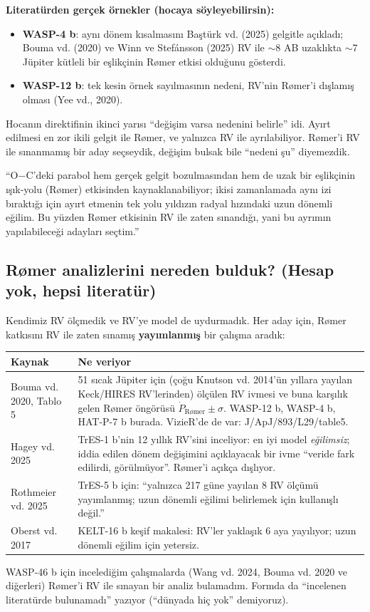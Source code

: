 \documentclass[11pt,a4paper]{article}
\newcommand{\OC}{O$-$C}
\begin{document}
\textbf{Literatürden gerçek örnekler (hocaya söyleyebilirsin):}
\begin{itemize}
\item \textbf{WASP-4 b}: aynı dönem kısalmasını Baştürk vd. (2025) gelgitle açıkladı; Bouma vd. (2020) ve Winn ve Stefánsson (2025) RV ile $\sim$8 AB uzaklıkta $\sim$7 Jüpiter kütleli bir eşlikçinin Rømer etkisi olduğunu gösterdi.
\item \textbf{WASP-12 b}: tek kesin örnek sayılmasının nedeni, RV'nin Rømer'i dışlamış olması (Yee vd., 2020).
\end{itemize}

Hocanın direktifinin ikinci yarısı ``değişim varsa nedenini belirle'' idi. Ayırt edilmesi en zor ikili gelgit ile Rømer, ve yalnızca RV ile ayrılabiliyor. Rømer'i RV ile sınanmamış bir aday seçseydik, değişim bulsak bile ``nedeni şu'' diyemezdik.

\begin{soyle}
``\OC{}'deki parabol hem gerçek gelgit bozulmasından hem de uzak bir eşlikçinin ışık-yolu (Rømer) etkisinden kaynaklanabiliyor; ikisi zamanlamada aynı izi bıraktığı için ayırt etmenin tek yolu yıldızın radyal hızındaki uzun dönemli eğilim. Bu yüzden Rømer etkisinin RV ile zaten sınandığı, yani bu ayrımın yapılabileceği adayları seçtim.''
\end{soyle}

\subsection{Rømer analizlerini nereden bulduk? (Hesap yok, hepsi literatür)}
Kendimiz RV ölçmedik ve RV'ye model de uydurmadık. Her aday için, Rømer katkısını RV ile zaten sınamış \textbf{yayımlanmış} bir çalışma aradık:

\begin{center}\small
\begin{tabularx}{\linewidth}{@{}lX@{}}
\toprule
Kaynak & Ne veriyor \\ \midrule
Bouma vd. 2020, Tablo 5 & 51 sıcak Jüpiter için (çoğu Knutson vd. 2014'ün yıllara yayılan Keck/HIRES RV'lerinden) ölçülen RV ivmesi ve buna karşılık gelen Rømer öngörüsü $\dot P_\text{Rømer}\pm\sigma$. WASP-12 b, WASP-4 b, HAT-P-7 b burada. VizieR'de de var: J/ApJ/893/L29/table5. \\
Hagey vd. 2025 & TrES-1 b'nin 12 yıllık RV'sini inceliyor: en iyi model \emph{eğilimsiz}; iddia edilen dönem değişimini açıklayacak bir ivme ``veride fark edilirdi, görülmüyor''. Rømer'i açıkça dışlıyor. \\
Rothmeier vd. 2025 & TrES-5 b için: ``yalnızca 217 güne yayılan 8 RV ölçümü yayımlanmış; uzun dönemli eğilimi belirlemek için kullanışlı değil.'' \\
Oberst vd. 2017 & KELT-16 b keşif makalesi: RV'ler yaklaşık 6 aya yayılıyor; uzun dönemli eğilim için yetersiz. \\ \bottomrule
\end{tabularx}
\end{center}
WASP-46 b için incelediğim çalışmalarda (Wang vd. 2024, Bouma vd. 2020 ve diğerleri) Rømer'i RV ile sınayan bir analiz bulamadım. Formda da ``incelenen literatürde bulunamadı'' yazıyor (``dünyada hiç yok'' demiyoruz).
\end{document}
